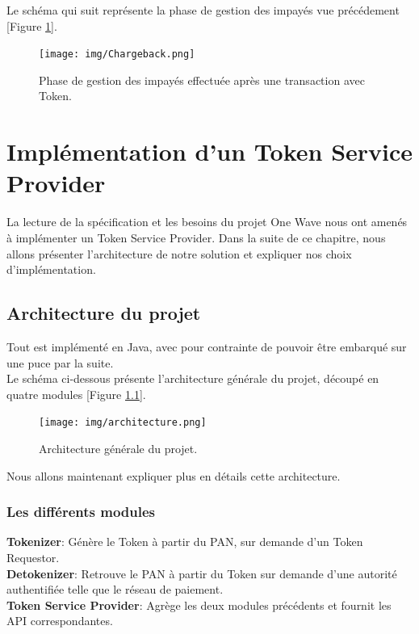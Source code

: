 \documentclass{report}
\begin{document}
\noindent
Le schéma qui suit représente la phase de gestion des impayés vue précédement [Figure \ref{Impayes}].

\begin{figure}[!ht]
    \centering
			\texttt{[image: img/Chargeback.png]}
			\caption{\label{Impayes} Phase de gestion des impayés effectuée après une transaction avec Token.}			
\end{figure}



\chapter{Implémentation d'un Token Service Provider}
La lecture de la spécification et les besoins du projet One Wave nous ont amenés à implémenter un Token Service Provider. Dans la suite de ce chapitre, nous allons présenter l'architecture de notre solution et expliquer nos choix d'implémentation.

\section{Architecture du projet}
Tout est implémenté en Java, avec pour contrainte de pouvoir être embarqué sur une puce par la suite.\\
Le schéma ci-dessous présente l'architecture générale du projet, découpé en quatre modules [Figure \ref{Architecture}].

\begin{figure}[!ht]
    \centering
			\texttt{[image: img/architecture.png]}
			\caption{\label{Architecture} Architecture générale du projet.}			
\end{figure}

\noindent
Nous allons maintenant expliquer plus en détails cette architecture.

\subsection{Les différents modules}
\noindent
\textbf{Tokenizer}: Génère le Token à partir du PAN, sur demande d'un Token Requestor.\\

\noindent
\textbf{Detokenizer}: Retrouve le PAN à partir du Token sur demande d'une autorité authentifiée telle que le réseau de paiement.\\

\noindent
\textbf{Token Service Provider}: Agrège les deux modules précédents et fournit les API correspondantes.\\
\end{document}
